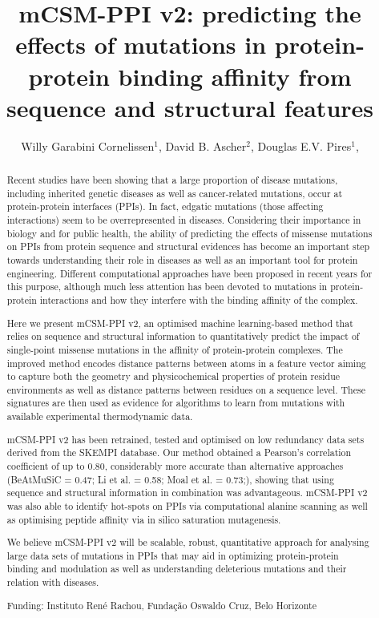 \documentclass[twoside]{article}
\title{\vspace{-15mm}\fontsize{24pt}{10pt}\selectfont\textbf{ mCSM-PPI v2: predicting the effects of mutations in protein-protein binding affinity from sequence and structural features }} %
\author{ Willy Garabini Cornelissen$^{1}$, David B. Ascher$^{2}$, Douglas E.V. Pires$^{1}$, }
\affil{ 1 Instituto René Rachou, Fundação Oswaldo Cruz

2 Department of Biochemistry and Molecular Biology, University of Melbourne, Melbourne

 }
\date{}
\begin{document}
  
  
  \maketitle %
  
  
  \thispagestyle{fancy} %
  
  
  \begin{abstract}
  Recent studies have been showing that a large proportion of disease mutations, including inherited genetic diseases as well as cancer-related mutations, occur at protein-protein interfaces (PPIs). In fact, edgatic mutations (those affecting interactions) seem to be overrepresented in diseases. Considering their importance in biology and for public health, the ability of predicting the effects of missense mutations on PPIs from protein sequence and structural evidences has become an important step towards understanding their role in diseases as well as an important tool for protein engineering. Different computational approaches have been proposed in recent years for this purpose, although much less attention has been devoted to mutations in protein-protein interactions and how they interfere with the binding affinity of the complex.

Here we present mCSM-PPI v2, an optimised machine learning-based method that relies on sequence and structural information to quantitatively predict the impact of single-point missense mutations in the affinity of protein-protein complexes. The improved method encodes distance patterns between atoms in a feature vector aiming to capture both the geometry and physicochemical properties of protein residue environments as well as distance patterns between residues on a sequence level. These signatures are then used as evidence for algorithms to learn from mutations with available experimental thermodynamic data.

mCSM-PPI v2 has been retrained,  tested and optimised on low redundancy data sets derived from the SKEMPI database. Our method obtained a Pearson's correlation coefficient of up to 0.80, considerably more accurate than alternative approaches (BeAtMuSiC = 0.47; Li et al. = 0.58; Moal et al. = 0.73;), showing that using sequence and structural information in combination was advantageous. mCSM-PPI v2 was also able to identify hot-spots on PPIs via computational alanine scanning as well as optimising peptide affinity via in silico saturation mutagenesis.

We believe mCSM-PPI v2 will be scalable, robust, quantitative approach for analysing large data sets of mutations in PPIs that may aid in optimizing protein-protein binding and modulation as well as  understanding deleterious mutations and their relation with diseases.
  
  Funding: Instituto Ren\'e Rachou, Funda\c{c}\~ao Oswaldo Cruz, Belo Horizonte \\ 
  \end{abstract}
  
\end{document}

